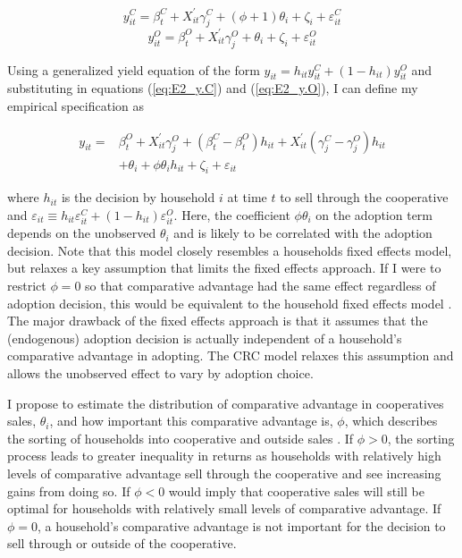 \documentclass[11pt]{article}
\begin{document}
\begin{equation} \label{eq:E2_y.C}
    y^{C}_{it} = \beta^{C}_{t} + X^{\prime}_{it}\gamma^{C}_{j} + (\phi + 1)\theta_{i} + \zeta_i + \varepsilon^{C}_{it}
\end{equation}
\begin{equation} \label{eq:E2_y.O}
    y^{O}_{it} = \beta^{O}_{t} + X^{\prime}_{it}\gamma^{O}_{j} + \theta_{i} + \zeta_i + \varepsilon^{O}_{it}
\end{equation}

Using a generalized yield equation of the form $y_{it} = h_{it}y^{C}_{it} + (1-h_{it})y^{O}_{it}$ and substituting in equations (\ref{eq:E2_y.C}) and (\ref{eq:E2_y.O}), I can define my empirical specification as

\begin{equation} \label{eq:E2_spec}
    \begin{split}
    y_{it} = & \beta^{O}_{t} + X^{\prime}_{it}\gamma^{O}_{j} + (\beta^{C}_{t} - \beta^{O}_{t})h_{it} +  X^{\prime}_{it}(\gamma^{C}_{j} - \gamma^{O}_{j})h_{it} \\
    & + \theta_{i} + \phi\theta_{i}h_{it} + \zeta_i + \varepsilon_{it}
    \end{split}
\end{equation}

where $h_{it}$ is the decision by household $i$ at time $t$ to sell through the cooperative and $\varepsilon_{it} \equiv h_{it}\varepsilon^{C}_{it} + (1-h_{it})\varepsilon^{O}_{it}$. Here, the coefficient $\phi\theta_{i}$ on the adoption term depends on the unobserved $\theta_{i}$ and is likely to be correlated with the adoption decision. Note that this model closely resembles a households fixed effects model, but relaxes a key assumption that limits the fixed effects approach. If I were to restrict $\phi = 0$ so that comparative advantage had the same effect regardless of adoption decision, this would be equivalent to the household fixed effects model \citep{suri11}. The major drawback of the fixed effects approach is that it assumes that the (endogenous) adoption decision is actually independent of a household’s comparative advantage in adopting. The CRC model relaxes this assumption and allows the unobserved effect to vary by adoption choice.

I propose to estimate the distribution of comparative advantage in cooperatives sales, $\theta_i$, and how important this comparative advantage is, $\phi$, which describes the sorting of households into cooperative and outside sales \citep{michler-et.al.18}. If $\phi > 0$, the sorting process leads to greater inequality in returns as households with relatively high levels of comparative advantage sell through the cooperative and see increasing gains from doing so. If $\phi < 0$ would imply that cooperative sales will still be optimal for households with relatively small levels of comparative advantage. If $\phi = 0$, a household’s comparative advantage is not important for the decision to sell through or outside of the cooperative.
\end{document}
